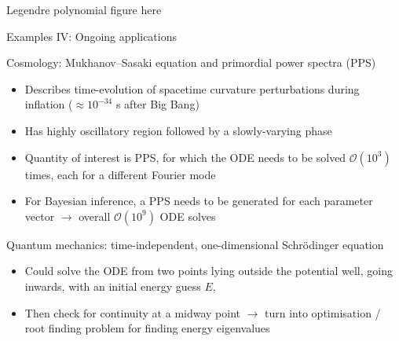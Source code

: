 \documentclass{beamer}
\numberwithin{equation}{theorem}
\begin{document}
\begin{noframe}
    Legendre polynomial figure here
\end{noframe}

\begin{noframe}
    Examples IV: Ongoing applications \\
    \medskip
    {\footnotesize
    Cosmology: Mukhanov--Sasaki equation and primordial power spectra (PPS)
    \begin{itemize}
    \item{Describes time-evolution of spacetime curvature perturbations during inflation ($\approx 10^{-34}$ s after Big Bang)}
    \item{Has highly oscillatory region followed by a slowly-varying phase}
    \item{Quantity of interest is PPS, for which the ODE needs to be solved $\mathcal{O}(10^3)$ times, each for a different Fourier mode}
    \item{For Bayesian inference, a PPS needs to be generated for each parameter vector $\rightarrow$ overall $\mathcal{O}(10^9)$ ODE solves}
    \end{itemize}
    Quantum mechanics: time-independent, one-dimensional Schr\"{o}dinger equation
    \begin{itemize}
    \item{Could solve the ODE from two points lying outside the potential well, going inwards, with an initial energy guess $E$,}
    \item{Then check for continuity at a midway point $\rightarrow$ turn into optimisation / root finding problem for finding energy eigenvalues}
    \end{itemize}
    }
\end{noframe}
\end{document}
